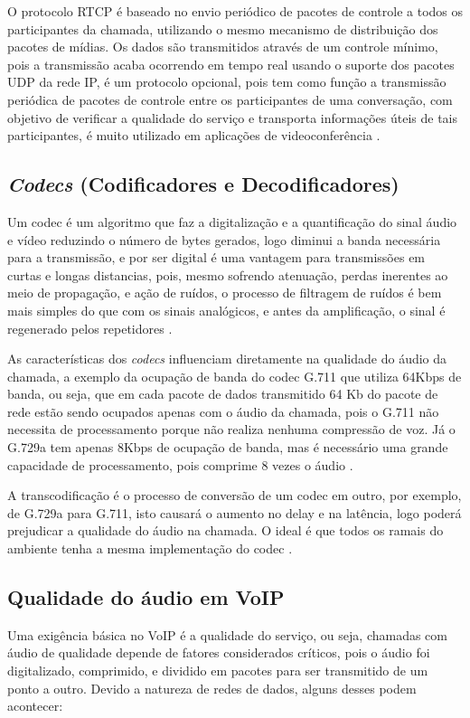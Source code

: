 O protocolo RTCP é baseado no envio periódico de pacotes de controle a todos os participantes da chamada, utilizando o mesmo mecanismo de distribuição dos pacotes de mídias. Os dados são transmitidos através de um controle mínimo, pois a transmissão acaba ocorrendo em tempo real usando o suporte dos pacotes UDP da rede IP, é um protocolo opcional, pois tem como função a transmissão periódica de pacotes de controle entre os participantes de uma conversação, com objetivo de verificar a qualidade do serviço e transporta informações úteis de tais participantes, é muito utilizado em aplicações de videoconferência \cite{henningcasnervan1996}.

\subsection{\textit{Codecs} (Codificadores e Decodificadores)}
Um codec é um algoritmo que faz a digitalização e a quantificação do sinal áudio e vídeo reduzindo o número de bytes gerados, logo diminui a banda necessária para a transmissão, e por ser digital é uma vantagem para transmissões em curtas e longas distancias, pois, mesmo sofrendo atenuação, perdas inerentes ao meio de propagação, e ação de ruídos, o processo de filtragem de ruídos é bem mais simples do que com os sinais analógicos, e antes da amplificação, o sinal é regenerado pelos repetidores \cite{eduardomaronasmonks2006}.

As características dos \textit{codecs} influenciam diretamente na qualidade do áudio da chamada, a exemplo da ocupação de banda do codec G.711 que utiliza 64Kbps de banda, ou seja, que em cada pacote de dados transmitido 64 Kb do pacote de rede estão sendo ocupados apenas com o áudio da chamada, pois o G.711 não necessita de processamento porque não realiza nenhuma compressão de voz. Já o G.729a tem apenas 8Kbps de ocupação de banda, mas é necessário uma grande capacidade de processamento, pois comprime 8 vezes o áudio \cite{alexandrekeller2014}.

A transcodificação é o processo de conversão de um codec em outro, por exemplo, de G.729a para G.711, isto causará o aumento no delay e na latência, logo poderá prejudicar a qualidade do áudio na chamada. O ideal é que todos os ramais do ambiente tenha a mesma implementação do codec \cite{alexandrekeller2014}.

\subsection{Qualidade do áudio em VoIP}
Uma exigência básica no VoIP é a qualidade do serviço, ou seja, chamadas com áudio de qualidade depende de fatores considerados críticos, pois o áudio foi digitalizado, comprimido, e dividido em pacotes para ser transmitido de um ponto a outro. Devido a natureza de redes de dados, alguns desses podem acontecer: \cite{davidson2008}

